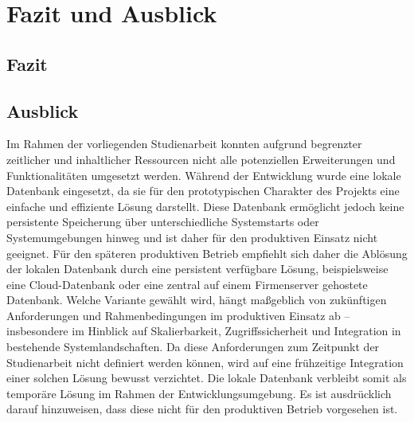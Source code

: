 


\chapter{Fazit und Ausblick}
\section*{Fazit}

\newpage
\section*{Ausblick}
Im Rahmen der vorliegenden Studienarbeit konnten aufgrund begrenzter zeitlicher und inhaltlicher Ressourcen nicht alle potenziellen Erweiterungen und Funktionalitäten umgesetzt werden. Während der Entwicklung wurde eine lokale Datenbank eingesetzt, da sie für den prototypischen Charakter des Projekts eine einfache und effiziente Lösung darstellt. Diese Datenbank ermöglicht jedoch keine persistente Speicherung über unterschiedliche Systemstarts oder Systemumgebungen hinweg und ist daher für den produktiven Einsatz nicht geeignet.
Für den späteren produktiven Betrieb empfiehlt sich daher die Ablösung der lokalen Datenbank durch eine persistent verfügbare Lösung, beispielsweise eine Cloud-Datenbank oder eine zentral auf einem Firmenserver gehostete Datenbank. Welche Variante gewählt wird, hängt maßgeblich von zukünftigen Anforderungen und Rahmenbedingungen im produktiven Einsatz ab – insbesondere im Hinblick auf Skalierbarkeit, Zugriffssicherheit und Integration in bestehende Systemlandschaften. Da diese Anforderungen zum Zeitpunkt der Studienarbeit nicht definiert werden können, wird auf eine frühzeitige Integration einer solchen Lösung bewusst verzichtet. Die lokale Datenbank verbleibt somit als temporäre Lösung im Rahmen der Entwicklungsumgebung. Es ist ausdrücklich darauf hinzuweisen, dass diese nicht für den produktiven Betrieb vorgesehen ist.

